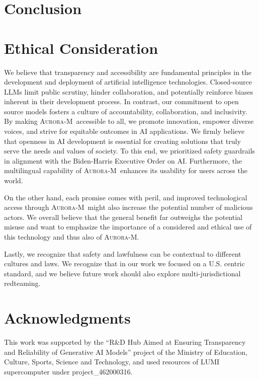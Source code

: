 \documentclass[11pt]{article}
\newcommand{\system}{\textsc{Aurora-M}}
\begin{document}
\section{Conclusion}



\section*{Ethical Consideration}
We believe that transparency and accessibility are fundamental principles in the development and deployment of artificial intelligence technologies. Closed-source LLMs limit public scrutiny, hinder collaboration, and potentially reinforce biases inherent in their development process. 
In contrast, our commitment to open source models fosters a culture of accountability, collaboration, and inclusivity. By making \system\ accessible to all, we promote innovation, empower diverse voices, and strive for equitable outcomes in AI applications. We firmly believe that openness in AI development is essential for creating solutions that truly serve the needs and values of society. To this end, we prioritized safety guardrails in alignment with the Biden-Harris Executive Order on AI. Furthermore, the multilingual capability of \system\ enhances its usability for users across the world.

On the other hand, each promise comes with peril, and improved technological access through \system\ might also increase the potential number of malicious actors. We overall believe that the general benefit far outweighs the potential misuse and want to emphasize the importance of a considered and ethical use of this technology and thus also of \system.

Lastly, we recognize that safety and lawfulness can be contextual to different cultures and laws. We recognize that in our work we focused on a U.S. centric standard, and we believe future work should also explore multi-jurisdictional redteaming.


\section*{Acknowledgments}
This work was supported by the ``R\&D Hub Aimed at Ensuring Transparency and Reliability of Generative AI Models'' project of the Ministry of Education, Culture, Sports, Science and Technology, and used resources of LUMI supercomputer under project\_462000316.
\end{document}
